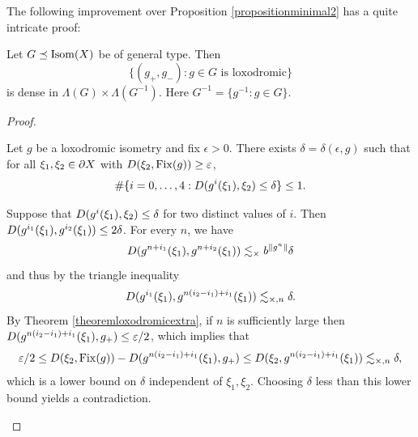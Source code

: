 The following improvement over Proposition \ref{propositionminimal2} has a quite intricate proof:

\begin{proposition}
\label{propositionminimal3}
Let $G\preceq\operatorname{Isom}(X)$ be of general type. Then
\[
\{(g_+,g_-) : g\in G \text{ is loxodromic}\}
\]
is dense in $\Lambda(G)\times\Lambda(G^{-1})$. Here $G^{-1} = \{g^{-1} : g\in G\}$.
\end{proposition}
\begin{proof}

\begin{claim}
\label{claimi04}
Let $g$ be a loxodromic isometry and fix $\epsilon > 0$. There exists $\delta = \delta(\epsilon,g)$ such that for all $\xi_1,\xi_2\in\partial X$ with $D(\xi_2,\operatorname{Fix}(g)) \geq \varepsilon$,
\[
\#\{i = 0,\ldots,4 : D(g^i(\xi_1),\xi_2) \leq \delta\} \leq 1.
\]
\end{claim}
\begin{subproof}
Suppose that $D(g^i(\xi_1),\xi_2) \leq \delta$ for two distinct values of $i$. Then $D(g^{i_1}(\xi_1),g^{i_2}(\xi_1)) \leq 2\delta$. For every $n$, we have
\[
D(g^{n + i_1}(\xi_1),g^{n + i_2}(\xi_1)) \lesssim_\times b^{\|g^n\|}\delta
\]
and thus by the triangle inequality
\[
D(g^{i_1}(\xi_1),g^{n(i_2 - i_1) + i_1}(\xi_1)) \lesssim_{\times,n} \delta.
\]
By Theorem \ref{theoremloxodromicextra}, if $n$ is sufficiently large then $D(g^{n(i_2 - i_1) + i_1}(\xi_1), g_+) \leq \varepsilon/2$, which implies that
\[
\varepsilon/2 \leq D(\xi_2,\operatorname{Fix}(g)) - D(g^{n(i_2 - i_1) + i_1}(\xi_1), g_+) \leq D(\xi_2, g^{n(i_2 - i_1) + i_1}(\xi_1)) \lesssim_{\times,n} \delta,
\]
which is a lower bound on $\delta$ independent of $\xi_1,\xi_2$. Choosing $\delta$ less than this lower bound yields a contradiction.
\end{subproof}


\end{proof}
